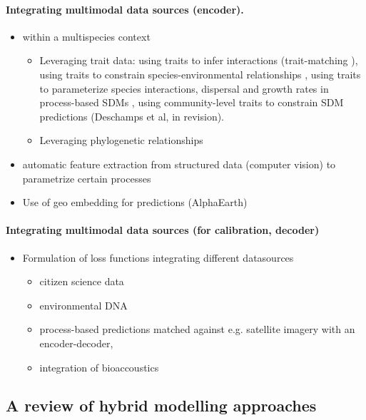 \paragraph{Integrating multimodal data sources (encoder).}
\begin{itemize}
    \item within a multispecies context
    \begin{itemize}
        \item Leveraging trait data: using traits to infer interactions (trait-matching \cite{pichler2020machine}), using traits to constrain species-environmental relationships \cite{pollock2012role}, using traits to parameterize species interactions, dispersal and growth rates in process-based SDMs \cite{chalmandrier2022predictions}, using community-level traits to constrain SDM predictions (Deschamps et al, in revision).  
        \item Leveraging phylogenetic relationships
    \end{itemize}
    \item automatic feature extraction from structured data (computer vision) to parametrize certain processes
    \item Use of geo embedding for predictions (AlphaEarth)
\end{itemize}

\paragraph{Integrating multimodal data sources (for calibration, decoder)}
\begin{itemize}
    \item Formulation of loss functions integrating different datasources \cite{Schneider2017}
    \begin{itemize}
        \item citizen science data \cite{brun2024, gillespie2024}
        \item environmental DNA \cite{Ruppert2019}
        \item process-based predictions matched against e.g. satellite imagery with an encoder-decoder, 
        \item integration of bioaccoustics \cite{Aide2013}
    \end{itemize}
    
\end{itemize}

\subsection{A review of hybrid modelling approaches}

